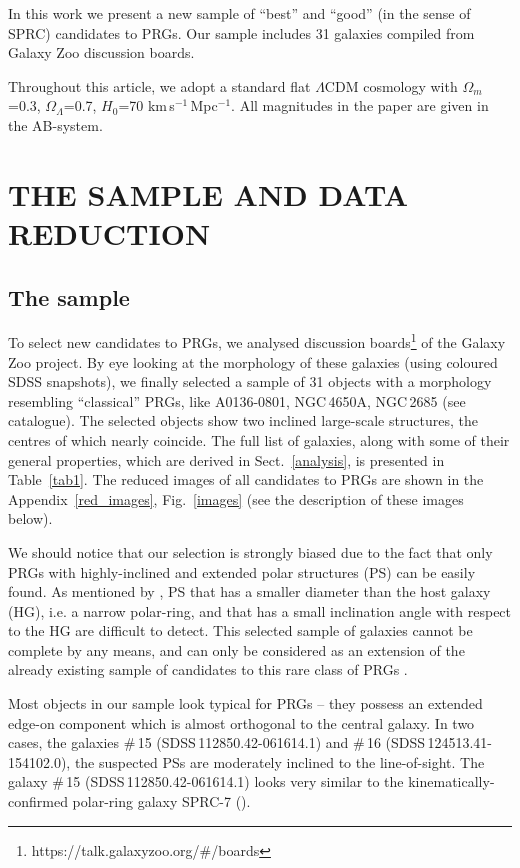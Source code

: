 \documentclass[a4paper,fleqn,usenatbib]{mnras}
\begin{document}
In this work we present a new sample of ``best'' and ``good'' (in the sense of
SPRC) candidates to PRGs. Our sample includes 31 galaxies compiled 
from Galaxy Zoo discussion boards. 

Throughout this article, we adopt a standard flat $\Lambda$CDM
cosmology with $\Omega_m$=0.3, $\Omega_{\Lambda}$=0.7, 
$H_0$=70 km\,s$^{-1}$\,Mpc$^{-1}$. All magnitudes in the paper are given
in the AB-system.


\section{THE SAMPLE AND DATA REDUCTION}

\subsection{The sample}
\label{sample}

To select new candidates to PRGs, we analysed discussion boards\footnote{https://talk.galaxyzoo.org/\#/boards}  
of the Galaxy Zoo project. By eye looking
at the morphology of these galaxies (using coloured SDSS snapshots), we finally 
selected a sample of 31 objects with a morphology resembling 
``classical'' PRGs, like A0136-0801, NGC\,4650A, NGC\,2685 (see \citealt{whit1990} 
catalogue). The selected objects show two inclined large-scale structures, 
the centres of which nearly coincide.
The full list of galaxies, along with some of their general properties, which are derived 
in Sect.~\ref{analysis}, is presented in Table~\ref{tab1}. The reduced 
images of all candidates to PRGs are shown in the Appendix~\ref{red_images}, 
Fig.~\ref{images} (see the description of these images below). 

We should notice that our selection is strongly biased 
due to the fact that only PRGs with highly-inclined and extended polar 
structures (PS) can be
easily found. As mentioned by \citet{whit1990}, PS that has a smaller
diameter than the host galaxy (HG), i.e. a narrow polar-ring, and that has a small
inclination angle with respect to the HG are difficult to detect.
This selected sample of galaxies cannot be complete by any means, and can 
only be considered as an extension of the already existing sample of candidates 
to this rare class of PRGs \citep[see e.g.][]{moiseev2011}.

Most objects in our sample look typical for PRGs -- they possess an extended
edge-on component which is almost orthogonal to the central galaxy. In two cases,
the galaxies \#\,15 (SDSS\,112850.42-061614.1) and \#\,16 
(SDSS\,124513.41-154102.0), the suspected 
PSs are moderately inclined to the line-of-sight. The galaxy \#\,15
(SDSS\,112850.42-061614.1) looks very similar to the kinematically-confirmed 
polar-ring galaxy SPRC-7 (\citealt{brosch2010}). 
\end{document}
